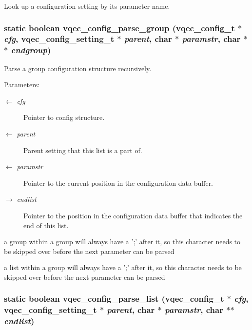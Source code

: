 Look up a configuration setting by its parameter name. 
\subsubsection{\setlength{\rightskip}{0pt plus 5cm}static boolean vqec\_\-config\_\-parse\_\-group (\bf{vqec\_\-config\_\-t} $\ast$ {\em cfg}, \bf{vqec\_\-config\_\-setting\_\-t} $\ast$ {\em parent}, char $\ast$ {\em paramstr}, char $\ast$$\ast$ {\em endgroup})\hspace{0.3cm}{\tt  [static]}}\label{vqec__config__parser_8c_d54e6e096bfa2ea36ac3e423564af545}


Parse a group configuration structure recursively.

\begin{Desc}
\item[Parameters:]
\begin{description}
\item[\mbox{$\leftarrow$} {\em cfg}]Pointer to config structure. \item[\mbox{$\leftarrow$} {\em parent}]Parent setting that this list is a part of. \item[\mbox{$\leftarrow$} {\em paramstr}]Pointer to the current position in the configuration data buffer. \item[\mbox{$\rightarrow$} {\em endlist}]Pointer to the position in the configuration data buffer that indicates the end of this list. \end{description}
\end{Desc}


a group within a group will always have a ';' after it, so this character needs to be skipped over before the next parameter can be parsed

a list within a group will always have a ';' after it, so this character needs to be skipped over before the next parameter can be parsed 
\subsubsection{\setlength{\rightskip}{0pt plus 5cm}static boolean vqec\_\-config\_\-parse\_\-list (\bf{vqec\_\-config\_\-t} $\ast$ {\em cfg}, \bf{vqec\_\-config\_\-setting\_\-t} $\ast$ {\em parent}, char $\ast$ {\em paramstr}, char $\ast$$\ast$ {\em endlist})\hspace{0.3cm}{\tt  [static]}}\label{vqec__config__parser_8c_c15a3269e0bb9fc5f7b32df3d10c1ec2}



